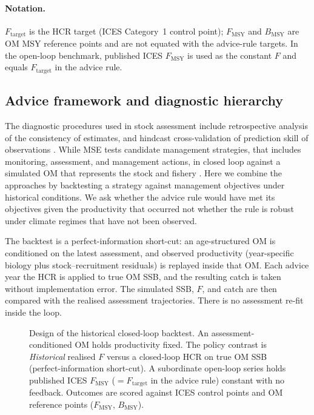 \documentclass[11pt,a4paper]{article}
\newcommand{\Fmsy}{F_{\mathrm{MSY}}}
\newcommand{\Bmsy}{B_{\mathrm{MSY}}}
\newcommand{\Ftar}{F_{\mathrm{target}}}
\begin{document}
\paragraph{Notation.} $\Ftar$ is the HCR target (ICES Category~1
control point); $\Fmsy$ and $\Bmsy$ are OM MSY reference points and are
not equated with the advice-rule targets. In the open-loop benchmark,
published ICES $F_{\mathrm{MSY}}$ is used as the constant $F$ and equals
$\Ftar$ in the advice rule.

\subsection{Advice framework and diagnostic hierarchy}
\label{sec:diag-hierarchy}

The diagnostic procedures used in stock assessment include retrospective analysis of the consistency of estimates, and hindcast cross-validation of prediction skill of observations \citep{Carvalho2021cookbook}. While MSE tests candidate management strategies, that includes monitoring, assessment, and  management actions, in closed loop against a
simulated OM that represents the stock and fishery \citep{punt2016msebestpractice}. Here we combine the approaches  by backtesting a strategy against management
objectives under historical conditions. We ask whether the advice rule would have met its objectives given the productivity that occurred not whether the rule is robust under climate regimes that have not been observed.

The backtest is a perfect-information short-cut: an age-structured OM is
conditioned on the latest assessment, and observed productivity
(year-specific biology plus stock--recruitment residuals) is replayed
inside that OM. Each advice year the HCR is applied to true OM SSB, and
the resulting catch is taken without implementation error. The simulated
SSB, $F$, and catch are then compared with the realised assessment
trajectories. There is no assessment re-fit inside the loop.

\begin{figure}[htbp]
\centering

\caption{Design of the historical closed-loop backtest. An
assessment-conditioned OM holds productivity fixed. The policy contrast is
\emph{Historical} realised $F$ versus a closed-loop HCR on true OM SSB
(perfect-information short-cut). A subordinate open-loop series holds
published ICES $F_{\mathrm{MSY}}$ ($=\Ftar$ in the advice rule) constant
with no feedback. Outcomes are scored against ICES control points and OM
reference points ($\Fmsy$, $\Bmsy$).}
\label{fig:design}
\end{figure}
\end{document}

